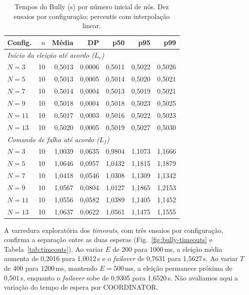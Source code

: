 \documentclass[conference]{IEEEtran}
\begin{document}
\begin{table}[t]
\centering
\caption{Tempos do Bully (s) por número inicial de nós. Dez ensaios por configuração; percentis com interpolação linear.}
\label{tab:res-bully}
\footnotesize
\begin{tabular}{lrrrrrr}
\toprule
\textbf{Config.} & $n$ & \textbf{Média} & \textbf{DP} & \textbf{p50} & \textbf{p95} & \textbf{p99} \\
\midrule
\multicolumn{7}{l}{\textit{Início da eleição até acordo ($L_e$)}} \\
$N=3$ & 10 & 0,5013 & 0,0006 & 0,5011 & 0,5022 & 0,5026 \\
$N=5$ & 10 & 0,5013 & 0,0005 & 0,5014 & 0,5020 & 0,5021 \\
$N=7$ & 10 & 0,5014 & 0,0004 & 0,5013 & 0,5019 & 0,5021 \\
$N=9$ & 10 & 0,5018 & 0,0004 & 0,5018 & 0,5023 & 0,5025 \\
$N=11$ & 10 & 0,5017 & 0,0003 & 0,5016 & 0,5022 & 0,5023 \\
$N=13$ & 10 & 0,5020 & 0,0005 & 0,5019 & 0,5027 & 0,5030 \\
\midrule
\multicolumn{7}{l}{\textit{Comando de falha até acordo ($L_f$)}} \\
$N=3$ & 10 & 1,0039 & 0,0635 & 0,9804 & 1,1073 & 1,1666 \\
$N=5$ & 10 & 1,0646 & 0,0957 & 1,0432 & 1,1815 & 1,1879 \\
$N=7$ & 10 & 1,0418 & 0,0546 & 1,0308 & 1,1309 & 1,1342 \\
$N=9$ & 10 & 1,0567 & 0,0804 & 1,0127 & 1,1865 & 1,2153 \\
$N=11$ & 10 & 1,0556 & 0,0582 & 1,0389 & 1,1405 & 1,1452 \\
$N=13$ & 10 & 1,0637 & 0,0622 & 1,0561 & 1,1475 & 1,1555 \\
\bottomrule
\end{tabular}
\end{table}

A varredura exploratória dos \textit{timeouts}, com três ensaios por configuração, confirma a separação entre as duas esperas (Fig.~\ref{fig:bully-timeouts} e Tabela~\ref{tab:timeouts}). Ao variar $E$ de 200 para 1000\,ms, a eleição média aumenta de 0,2016 para 1,0012\,s e o \textit{failover} de 0,7631 para 1,5627\,s. Ao variar $T$ de 400 para 1200\,ms, mantendo $E=500$\,ms, a eleição permanece próxima de 0,501\,s, enquanto o \textit{failover} sobe de 0,9305 para 1,6520\,s. Não avaliamos aqui a variação do tempo de espera por COORDINATOR.
\end{document}
